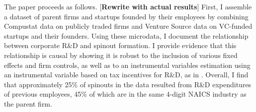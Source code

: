 \documentclass[12pt,english]{article}
\theoremstyle{remark}
\begin{document}
The paper proceeds as follows. [\textbf{Rewrite with actual results}] First, I assemble a dataset of parent firms and startups founded by their employees by combining Compustat data on publicly traded firms and Venture Source data on VC-funded startups and their founders. Using these microdata, I document the relationship between corporate R\&D and spinout formation. I provide evidence that this relationship is causal by showing it is robust to the inclusion of various fixed effects and firm controls, as well as to an instrumental variables estimation using an instrumental variable based on tax incentives for R\&D, as in \cite{bloom_identifying_2013}. Overall, I find that approximately 25\% of spinouts in the data resulted from R\&D expenditures of previous employees, 45\% of which are in the same 4-digit NAICS industry as the parent firm. 
\end{document}
